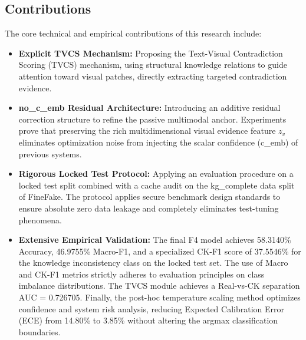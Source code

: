 \subsection{Contributions}
The core technical and empirical contributions of this research include:
\begin{itemize}
    \item \textbf{Explicit TVCS Mechanism:} Proposing the Text-Visual Contradiction Scoring (TVCS) mechanism, using structural knowledge relations to guide attention toward visual patches, directly extracting targeted contradiction evidence.
    \item \textbf{no\_c\_emb Residual Architecture:} Introducing an additive residual correction structure to refine the passive multimodal anchor. Experiments prove that preserving the rich multidimensional visual evidence feature $z_v$ eliminates optimization noise from injecting the scalar confidence (c\_emb) of previous systems.
    \item \textbf{Rigorous Locked Test Protocol:} Applying an evaluation procedure on a locked test split combined with a cache audit on the kg\_complete data split of FineFake. The protocol applies secure benchmark design standards to ensure absolute zero data leakage and completely eliminates test-tuning phenomena.
    \item \textbf{Extensive Empirical Validation:} The final F4 model achieves 58.3140\% Accuracy, 46.9755\% Macro-F1, and a specialized CK-F1 score of 37.5546\% for the knowledge inconsistency class on the locked test set. The use of Macro and CK-F1 metrics strictly adheres to evaluation principles on class imbalance distributions. The TVCS module achieves a Real-vs-CK separation AUC = 0.726705. Finally, the post-hoc temperature scaling method \cite{ref10} optimizes confidence and system risk analysis, reducing Expected Calibration Error (ECE) from 14.80\% to 3.85\% without altering the argmax classification boundaries.
\end{itemize}
